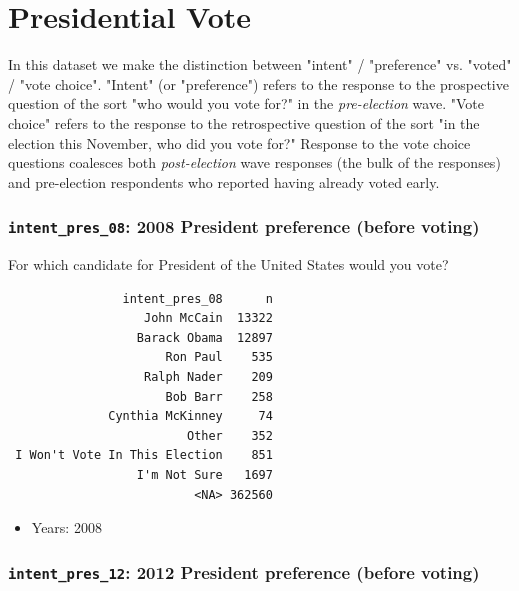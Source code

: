 \documentclass[10pt,article,oneside]{memoir}
\theoremstyle{definition}
\begin{document}
\newpage

\section{Presidential Vote}\label{presidential-vote}

\begin{tcolorbox}[title={A note on \texttt{intent} and \texttt{voted}}]
In this dataset we make the distinction between "intent" / "preference" vs. "voted" / "vote choice". "Intent" (or "preference") refers to the response to the prospective question of the sort "who would you vote for?" in the \emph{pre-election} wave. "Vote choice" refers to the response to the retrospective question of the sort "in the election this November, who did you vote for?" Response to the vote choice questions coalesces both \emph{post-election} wave responses (the bulk of the responses) and pre-election respondents who reported having already voted early. 
\end{tcolorbox}

\subsubsection{\texorpdfstring{\texttt{intent\_pres\_08}: 2008 President
preference (before
voting)}{intent\_pres\_08: 2008 President preference (before voting)}}\label{intent_pres_08-2008-president-preference-before-voting}

For which candidate for President of the United States would you vote?

\begin{verbatim}
                intent_pres_08      n
                   John McCain  13322
                  Barack Obama  12897
                      Ron Paul    535
                   Ralph Nader    209
                      Bob Barr    258
              Cynthia McKinney     74
                         Other    352
 I Won't Vote In This Election    851
                  I'm Not Sure   1697
                          <NA> 362560
\end{verbatim}

\begin{itemize}
\tightlist
\item
  Years: 2008
\end{itemize}

\subsubsection{\texorpdfstring{\texttt{intent\_pres\_12}: 2012 President
preference (before
voting)}{intent\_pres\_12: 2012 President preference (before voting)}}\label{intent_pres_12-2012-president-preference-before-voting}
\end{document}
